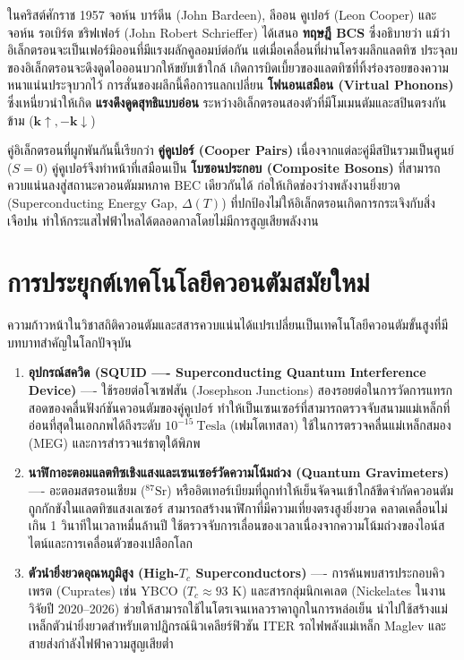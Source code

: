 ในคริสต์ศักราช 1957 จอห์น บาร์ดีน (John Bardeen), ลีออน คูเปอร์ (Leon Cooper) และจอห์น รอเบิร์ต ชริฟเฟอร์ (John Robert Schrieffer) ได้เสนอ \textbf{ทฤษฎี BCS} ซึ่งอธิบายว่า แม้ว่าอิเล็กตรอนจะเป็นเฟอร์มิออนที่มีแรงผลักคูลอมบ์ต่อกัน แต่เมื่อเคลื่อนที่ผ่านโครงผลึกแลตทิซ ประจุลบของอิเล็กตรอนจะดึงดูดไอออนบวกให้ขยับเข้าใกล้ เกิดการบิดเบี้ยวของแลตทิซที่ทิ้งร่องรอยของความหนาแน่นประจุบวกไว้ การสั่นของผลึกนี้คือการแลกเปลี่ยน \textbf{โฟนอนเสมือน (Virtual Phonons)} ซึ่งเหนี่ยวนำให้เกิด \textbf{แรงดึงดูดสุทธิแบบอ่อน} ระหว่างอิเล็กตรอนสองตัวที่มีโมเมนตัมและสปินตรงกันข้าม ($\mathbf{k}\uparrow, -\mathbf{k}\downarrow$)

คู่อิเล็กตรอนที่ผูกพันกันนี้เรียกว่า \textbf{คู่คูเปอร์ (Cooper Pairs)} เนื่องจากแต่ละคู่มีสปินรวมเป็นศูนย์ ($S = 0$) คู่คูเปอร์จึงทำหน้าที่เสมือนเป็น \textbf{โบซอนประกอบ (Composite Bosons)} ที่สามารถควบแน่นลงสู่สถานะควอนตัมมหภาค BEC เดียวกันได้ ก่อให้เกิดช่องว่างพลังงานยิ่งยวด (Superconducting Energy Gap, $\Delta(T)$) ที่ปกป้องไม่ให้อิเล็กตรอนเกิดการกระเจิงกับสิ่งเจือปน ทำให้กระแสไฟฟ้าไหลได้ตลอดกาลโดยไม่มีการสูญเสียพลังงาน

\section{การประยุกต์เทคโนโลยีควอนตัมสมัยใหม่}

ความก้าวหน้าในวิชาสถิติควอนตัมและสสารควบแน่นได้แปรเปลี่ยนเป็นเทคโนโลยีควอนตัมขั้นสูงที่มีบทบาทสำคัญในโลกปัจจุบัน
\begin{enumerate}
    \item \textbf{อุปกรณ์สควิด (SQUID ---- Superconducting Quantum Interference Device)} ---- ใช้รอยต่อโจเซฟสัน (Josephson Junctions) สองรอยต่อในการวัดการแทรกสอดของคลื่นฟังก์ชันควอนตัมของคู่คูเปอร์ ทำให้เป็นเซนเซอร์ที่สามารถตรวจจับสนามแม่เหล็กที่อ่อนที่สุดในเอกภพได้ถึงระดับ $10^{-15}~\text{Tesla}$ (เฟมโตเทสลา) ใช้ในการตรวจคลื่นแม่เหล็กสมอง (MEG) และการสำรวจแร่ธาตุใต้พิภพ
    \item \textbf{นาฬิกาอะตอมแลตทิซเชิงแสงและเซนเซอร์วัดความโน้มถ่วง (Quantum Gravimeters)} ---- อะตอมสตรอนเชียม ($^{87}\text{Sr}$) หรืออิตเทอร์เบียมที่ถูกทำให้เย็นจัดจนเข้าใกล้ขีดจำกัดควอนตัมถูกกักขังในแลตทิซแสงเลเซอร์ สามารถสร้างนาฬิกาที่มีความเที่ยงตรงสูงยิ่งยวด คลาดเคลื่อนไม่เกิน 1 วินาทีในเวลาหมื่นล้านปี ใช้ตรวจจับการเลื่อนของเวลาเนื่องจากความโน้มถ่วงของไอน์สไตน์และการเคลื่อนตัวของเปลือกโลก
    \item \textbf{ตัวนำยิ่งยวดอุณหภูมิสูง (High-$T_c$ Superconductors)} ---- การค้นพบสารประกอบคิวเพรต (Cuprates) เช่น YBCO ($T_c \approx 93\text{ K}$) และสารกลุ่มนิกเคเลต (Nickelates ในงานวิจัยปี 2020--2026) ช่วยให้สามารถใช้ไนโตรเจนเหลวราคาถูกในการหล่อเย็น นำไปใช้สร้างแม่เหล็กตัวนำยิ่งยวดสำหรับเตาปฏิกรณ์นิวเคลียร์ฟิวชัน ITER รถไฟพลังแม่เหล็ก Maglev และสายส่งกำลังไฟฟ้าความสูญเสียต่ำ
\end{enumerate}

